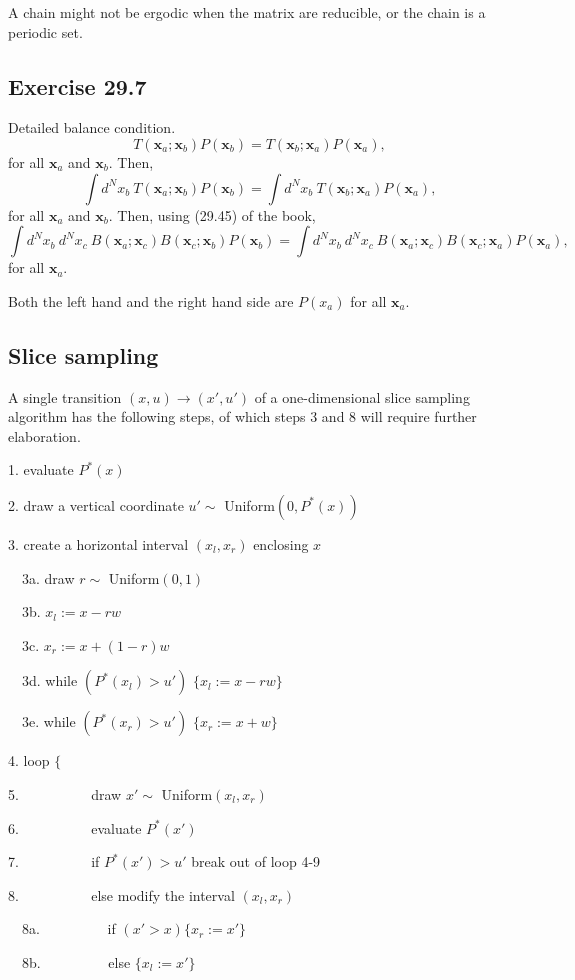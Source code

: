 \documentclass[a4paper,11pt]{article}
\newcommand{\vect}[1]{\boldsymbol{\mathbf{#1}}}
\numberwithin{equation}{section}
\begin{document}
{A chain might not be ergodic when the matrix are reducible, or the chain is a periodic set. 

\subsection{Exercise 29.7}
Detailed balance condition. 
$$
T(\vect x_a ; \vect x_b)P(\vect x_b) = T(\vect x_b ; \vect x_a)P(\vect x_a),
$$
for all $\vect x_a$ and $\vect x_b$. 
Then, 
$$
\int d^N x_b~T(\vect x_a ; \vect x_b)P(\vect x_b) = \int d^N x_b~T(\vect x_b ; \vect x_a)P(\vect x_a),
$$
for all $\vect x_a$ and $\vect x_b$.
Then, using (29.45) of the book,
$$
\int d^N x_b ~d^N x_c~B(\vect x_a ; \vect x_c)B(\vect x_c ; \vect x_b)P(\vect x_b) =\int d^N x_b ~d^N x_c~B(\vect x_a ; \vect x_c)B(\vect x_c ; \vect x_a)P(\vect x_a),
$$
for all $\vect x_a$.

Both the left hand and the right hand side are $P(x_a)$ for all $\vect x_a$.

\subsection{Slice sampling}

A single transition $(x,u) \rightarrow (x',u')$ of a one-dimensional slice sampling
algorithm has the following steps, of which steps 3 and 8 will require further
elaboration.

1. evaluate $P^*(x)$

2. draw a vertical coordinate $u' \sim$ Uniform$(0,P^*(x))$

3. create a horizontal interval $(x_l, x_r)$ enclosing $x$

~~3a. draw $r \sim$ Uniform$(0,1)$

~~3b. $x_l := x-rw$

~~3c. $x_r := x+(1-r)w$

~~3d. while $(P^*(x_l) > u')$ $\{x_l := x-rw\}$

~~3e. while $(P^*(x_r) > u')$ $\{x_r:= x+w\}$

4. loop $\{$

5. ~~~~~~~~~ draw $x' \sim$ Uniform$(x_l,x_r)$

6. ~~~~~~~~~ evaluate $P^*(x')$

7. ~~~~~~~~~ if $P^*(x') >u'$ break out of loop 4-9

8. ~~~~~~~~~ else modify the interval $(x_l,x_r)$

~~8a. ~~~~~~~~~if $(x' > x)\{x_r:=x'\}$

~~8b. ~~~~~~~~~else $\{x_l:=x'\}$ 

}
\end{document}
